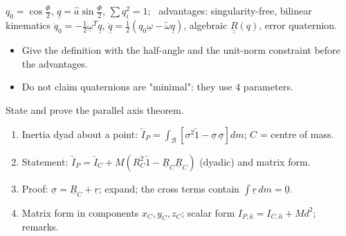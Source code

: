 \begin{keyf}
$q_0=\cos\frac\Phi2$, $\underline q=\hat a\sin\frac\Phi2$, $\sum q_i^2=1$; \ advantages: singularity-free, bilinear kinematics
$\dot q_0=-\frac12\underline\omega^T\underline q$, $\dot{\underline q}=\frac12(q_0\underline\omega-\tilde\omega\underline q)$, algebraic $\underline{\underline R}(q)$, error quaternion.
\end{keyf}

\pitfalls
\begin{itemize}
\item Give the definition with the half-angle and the unit-norm constraint before the advantages.
\item Do not claim quaternions are "minimal": they use 4 parameters.
\end{itemize}


\begin{qbox}
State and prove the parallel axis theorem.
\end{qbox}

\begin{outline}
\begin{enumerate}
\item Inertia dyad about a point: $\underrightarrow I_P=\int_{\mathcal B}[\sigma^2\underrightarrow1-\underline\sigma\,\underline\sigma]dm$; $C$ = centre of mass.
\item Statement: $\underrightarrow I_P=\underrightarrow I_C+M\left(R_C^2\underrightarrow1-\underline R_C\underline R_C\right)$ (dyadic) and matrix form.
\item Proof: $\underline\sigma=\underline R_C+\underline r$; expand; the cross terms contain $\int\underline r\,dm=\underline 0$.
\item Matrix form in components $x_C,y_C,z_C$; scalar form $I_{P,\hat a}=I_{C,\hat a}+Md^2$; remarks.
\end{enumerate}
\end{outline}

\answer
